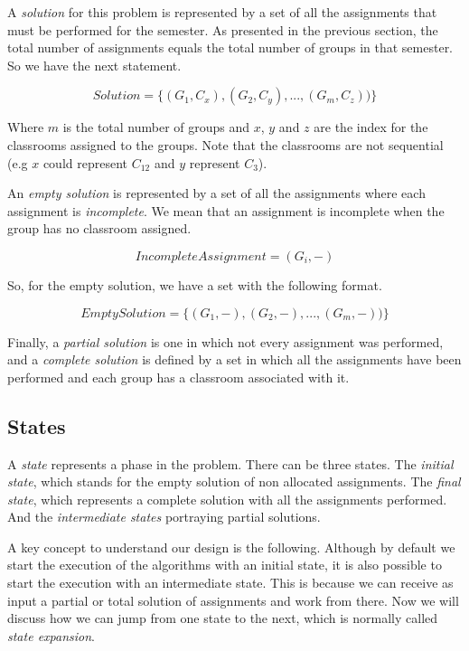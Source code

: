 A \textit{solution} for this problem is represented by a set of all the assignments that must be performed for the semester. As presented in the previous section, the total number of assignments equals the total number of groups in that semester. So we have the next statement.

\begin{equation}
    Solution = \{ (G_{1}, C_{x}), (G_{2}, C_{y}), ..., (G_{m}, C_{z})) \}
\end{equation}

Where $m$ is the total number of groups and $x$, $y$ and $z$ are the index for the classrooms assigned to the groups. Note that the classrooms are not sequential (e.g $x$ could represent $C_{12}$ and $y$ represent $C_{3}$).

An \textit{empty solution} is represented by a set of all the assignments where each assignment is \textit{incomplete}. We mean that an assignment is incomplete when the group has no classroom assigned.

\begin{equation}
    IncompleteAssignment = (G_{i}, -)
\end{equation}

So, for the empty solution, we have a set with the following format.

\begin{equation}
    EmptySolution = \{ (G_{1}, -), (G_{2}, -), ..., (G_{m}, -)) \}
\end{equation}

Finally, a \textit{partial solution} is one in which not every assignment was performed, and a \textit{complete solution} is defined by a set in which all the assignments have been performed and each group has a classroom associated with it.

\subsection{States}

A \textit{state} represents a phase in the problem. There can be three states. The \textit{initial state}, which stands for the empty solution of non allocated assignments. The \textit{final state}, which represents a complete solution with all the assignments performed. And the \textit{intermediate states} portraying partial solutions.

A key concept to understand our design is the following. Although by default we start the execution of the algorithms with an initial state, it is also possible to start the execution with an intermediate state. This is because we can receive as input a partial or total solution of assignments and work from there. Now we will discuss how we can jump from one state to the next, which is normally called \textit{state expansion}.

